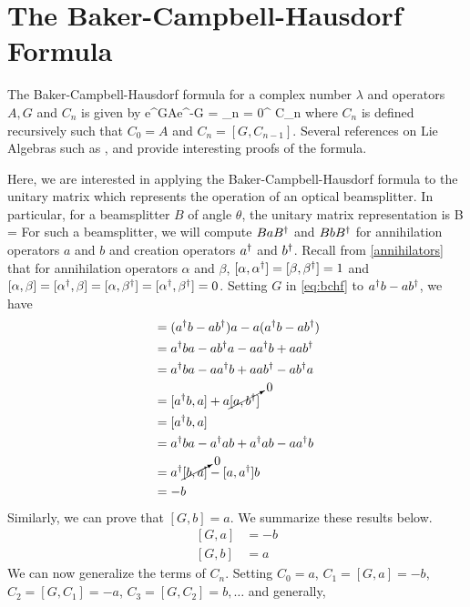 \chapter{The Baker-Campbell-Hausdorf Formula\label{ch:bchf}}
The Baker-Campbell-Hausdorf formula for a complex number $\lambda$ and operators $A,G$ and $C_n$ is given by
\beq
\label{eq:bchf}
e^{\lambda G}Ae^{-\lambda G} = \sum\limits_{n = 0}^\infty {} C_n
\eeq
where $C_n$ is defined recursively such that $C_0 = A$ and $C_n = [G,C_{n-1}]$. Several references on Lie Algebras such as \cite{liealgs}, \cite{liealgs2} and \cite{liealgs3} provide interesting proofs of the formula.

Here, we are interested in applying the Baker-Campbell-Hausdorf formula to the unitary matrix which represents the operation of an optical beamsplitter. In particular, for a beamsplitter $B$ of angle $\theta$, the unitary matrix representation is
\beq
\label{eq:bseq}
B = 
\eeq
For such a beamsplitter, we will compute $BaB^\dagger$ and $BbB^\dagger$ for annihilation operators $a$ and $b$ and creation operators $a^\dagger$ and $b^\dagger$. Recall from \ref{annihilators} that for annihilation operators $\alpha$ and $\beta$, $[\alpha,\alpha^\dagger] = [\beta,\beta^\dagger] = 1$ and $[\alpha,\beta] = [\alpha^\dagger,\beta] = [\alpha,\beta^\dagger] = [\alpha^\dagger,\beta^\dagger] = 0$. 
Setting $G$ in \eqref{eq:bchf} to $a^\dagger b - ab^\dagger$, we have
\begin{align*}
[G,a] &= (\adj{a} b - a\adj{b})a - a(\adj{a} b - a\adj{b}) \\
&= \adj{a}ba - a\adj{b}a - a\adj{a}b + aa\adj{b}\\
&= \adj{a}ba - a\adj{a}b + aa\adj{b} - a\adj{b}a\\
&= [\adj{a}b,a] + a\cancelto{0}{[a,\adj{b}]}\\
&= [\adj{a}b,a]\\
&= \adj{a}ba - \adj{a}ab + \adj{a}ab - a\adj{a}b\\
&= \adj{a}\cancelto{0}{[b,a]} - [a,\adj{a}]b\\
&= -b
\end{align*}
Similarly, we can prove that $[G,b] = a$. We summarize these results below. 
\begin{align}
\label{eq:Gcommutes}
[G,a] &= -b\\
[G,b] &= a
\end{align}
We can now generalize the terms of $C_n$. Setting $C_0 = a$, $C_1 = [G,a] = -b$, $C_2 = [G,C_1] = -a$, $C_3 = [G,C_2] = b,\ldots$ and generally,
